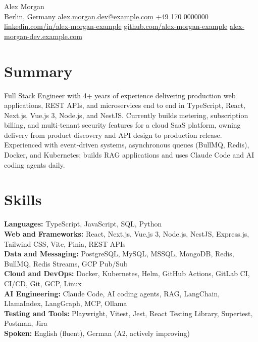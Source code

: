 \documentclass[10pt,a4paper]{article}
\begin{document}
\begin{center}
    {\LARGE Alex Morgan}\\[3pt]
    Berlin, Germany \textbar{} \href{mailto:alex.morgan.dev@example.com}{alex.morgan.dev@example.com} \textbar{} +49 170 0000000\\
    \href{https://linkedin.com/in/alex-morgan-example}{linkedin.com/in/alex-morgan-example} \textbar{} \href{https://github.com/alex-morgan-example}{github.com/alex-morgan-example} \textbar{} \href{https://alex-morgan-dev.example.com}{alex-morgan-dev.example.com}
\end{center}

\vspace{-6pt}

\section*{Summary}
Full Stack Engineer with 4+ years of experience delivering production web applications, REST APIs, and microservices end to end in TypeScript, React, Next.js, Vue.js 3, Node.js, and NestJS. Currently builds metering, subscription billing, and multi-tenant security features for a cloud SaaS platform, owning delivery from product discovery and API design to production release. Experienced with event-driven systems, asynchronous queues (BullMQ, Redis), Docker, and Kubernetes; builds RAG applications and uses Claude Code and AI coding agents daily.

\section*{Skills}
\textbf{Languages:} TypeScript, JavaScript, SQL, Python\\
\textbf{Web and Frameworks:} React, Next.js, Vue.js 3, Node.js, NestJS, Express.js, Tailwind CSS, Vite, Pinia, REST APIs\\
\textbf{Data and Messaging:} PostgreSQL, MySQL, MSSQL, MongoDB, Redis, BullMQ, Redis Streams, GCP Pub/Sub\\
\textbf{Cloud and DevOps:} Docker, Kubernetes, Helm, GitHub Actions, GitLab CI, CI/CD, Git, GCP, Linux\\
\textbf{AI Engineering:} Claude Code, AI coding agents, RAG, LangChain, LlamaIndex, LangGraph, MCP, Ollama\\
\textbf{Testing and Tools:} Playwright, Vitest, Jest, React Testing Library, Supertest, Postman, Jira\\
\textbf{Spoken:} English (fluent), German (A2, actively improving)
\end{document}
